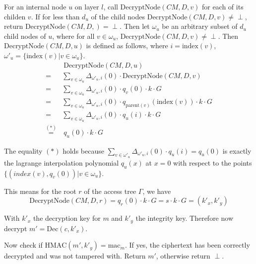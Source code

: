 For an internal node $u$ on layer $l$, call $\text{DecryptNode}(CM, D, v)$ for each of its childen $v$. If for less than $d_u$ of the child nodes $\text{DecryptNode}(CM, D, v) \neq \perp$, return $\text{DecryptNode}(CM, D, )=\perp$.
Then let $\omega_u$ be an arbitrary subset of $d_u$ child nodes of $u$, where for all $v \in \omega_u$, $\text{DecryptNode}(CM, D, v) \neq \perp$.
Then $\text{DecryptNode}(CM, D, u)$ is defined as follows, where $i = \text{index}(v)$, $\omega'_u = \{\text{index}(v) | v \in \omega_u\}$.
\begin{equation*}
    \begin{split}
        &~\text{DecryptNode}(CM, D, u)\\
        =& \sum_{v \in \omega_u} \Delta_{\omega'_u, i}(0) \cdot \text{DecryptNode}(CM, D, v)\\
        =& \sum_{v \in \omega_u} \Delta_{\omega'_u, i}(0) \cdot q_v(0) \cdot k \cdot G\\
        =& \sum_{v \in \omega_u} \Delta_{\omega'_u, i}(0) \cdot q_{\text{parent}(v)}(\text{index}(v)) \cdot k \cdot G\\
        =& \sum_{v \in \omega_u} \Delta_{\omega'_u, i}(0) \cdot q_u(i) \cdot k \cdot G\\
        \stackrel{(*)}{=}&~q_u(0) \cdot k \cdot G
    \end{split}
\end{equation*}

The equality $(*)$ holds because $\sum_{v \in \omega'_u} \Delta_{\omega'_u, i}(0) \cdot q_u(i) = q_u(0)$ is exactly the lagrange interpolation polynomial $q_u(x)$ at $x = 0$ with respect to the points $\{(index(v), q_v(0)) | v \in \omega_u\}$. 

This means for the root $r$ of the access tree $\Gamma$, we have
\begin{equation*}
    \text{DecryptNode}(CM, D, r) =  q_r(0) \cdot k \cdot G = s \cdot k \cdot G = (k'_x, k'_y)
\end{equation*}

With $k'_x$ the decryption key for $m$ and $k'_y$ the integrity key. Therefore now decrypt $m' = \text{Dec}(c, k'_x)$.

Now check if $\text{HMAC}(m', k'_y) = \text{mac}_m$. If yes, the ciphertext has been correctly decrypted and was not tampered with. Return $m'$, otherwise return $\perp$.